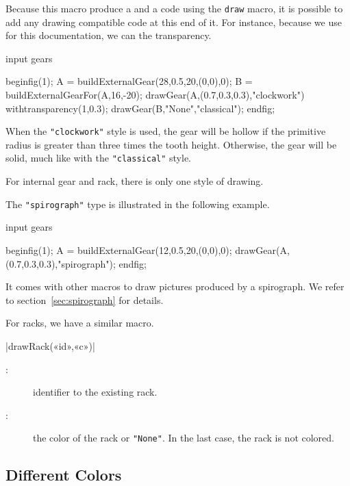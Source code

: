 \documentclass[english]{ltxdoc}
\begin{document}
Because this macro produce a  and a code using the
\lstinline+draw+  macro, it is possible to add any drawing
compatible  code at this end of it. For instance, because we
use ~\cite{luamplib} for this documentation, we can the \pdf{}
transparency.

\begin{ExempleMP}
input gears

beginfig(1);
A = buildExternalGear(28,0.5,20,(0,0),0);
B = buildExternalGearFor(A,16,-20);
drawGear(A,(0.7,0.3,0.3),"clockwork") withtransparency(1,0.3);
drawGear(B,"None","classical");
endfig;
\end{ExempleMP}

When the \lstinline+"clockwork"+ style is used, the gear will be hollow if the
primitive radius is greater than three times the tooth height. Otherwise, the
gear will be solid, much like with the \lstinline+"classical"+  style.

For internal gear and rack, there is only one style of drawing. 

The \lstinline+"spirograph"+ type is illustrated in the following example.

\begin{ExempleMP}
input gears

beginfig(1);
A = buildExternalGear(12,0.5,20,(0,0),0);
drawGear(A,(0.7,0.3,0.3),"spirograph");
endfig;
\end{ExempleMP}

It comes with other macros to draw pictures produced by a spirograph. We refer
to section~\ref{sec:spirograph} for details.

For racks, we have a similar macro. 
\begin{colourband}
\commande|drawRack(«id»,«c»)|\smallskip{}
\begin{description}
  \item[:]  identifier to the existing rack.
  \item[:]  the color of the rack or 
  \lstinline+"None"+. In the last case, the rack is not colored.
\end{description}
\end{colourband}


\subsection{Different Colors}
\end{document}
